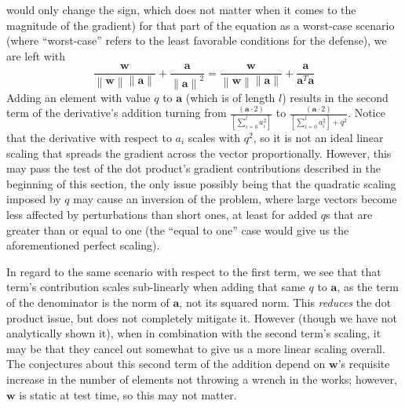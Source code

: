 would only change the sign, which does not matter when it comes to the magnitude of the gradient)
for that part of the equation as a worst-case scenario (where ``worst-case'' refers to the least
favorable conditions for the defense), we are left with
\begin{equation}
    \frac{
            \mathbf{w}
    }{
        \left\| \mathbf{w} \right\| \left\| \mathbf{a} \right\|
    }   +   \frac{
                    \mathbf{a}
            }{
                    \left\| \mathbf{a} \right\|^2
            }
    = \frac{
              \mathbf{w}
      }{
          \left\| \mathbf{w} \right\| \left\| \mathbf{a} \right\|
      }   +   \frac{
                      \mathbf{a}
              }{
                      \mathbf{a}^T \mathbf{a}
              }
    \label{upperbounded}
\end{equation}
Adding an element with value $q$ to $\mathbf{a}$ (which is of length $l$) results in the second term
of the derivative's addition turning from $\frac{  (\mathbf{a} \cdot 2)  }{  \left[ \sum_{i = 0}^{l}
a^2_{i} \right]  }$ to $\frac{  (\mathbf{a} \cdot 2)  }{  \left[ \sum_{i = 0}^{l} a^2_{i} \right] +
q^2  }$. Notice that the derivative with respect to $a_i$ scales with $q^2$, so it is not an ideal
linear scaling that spreads the gradient across the vector proportionally. However, this may pass
the test of the dot product's gradient contributions described in the beginning of this section, the
only issue possibly being that the quadratic scaling imposed by $q$ may cause an inversion of the problem,
where large vectors become less affected by perturbations than short ones, at least for added $q$s
that are greater than or equal to one (the ``equal to one'' case would give us the aforementioned perfect
scaling).

In regard to the same scenario with respect to the first term, we see that that term's contribution
scales sub-linearly when adding that same $q$ to $\mathbf{a}$, as the term of the denominator is the
norm of $\mathbf{a}$, not its squared norm. This \textit{reduces} the dot product issue, but does
not completely mitigate it. However (though we have not analytically shown it), when in combination
with the second term's scaling, it may be that they cancel out somewhat to give us a more linear
scaling overall. The conjectures about this second term of the addition depend on $\mathbf{w}$'s
requisite increase in the number of elements not throwing a wrench in the works; however,
$\textbf{w}$ is static at test time, so this may not matter.


